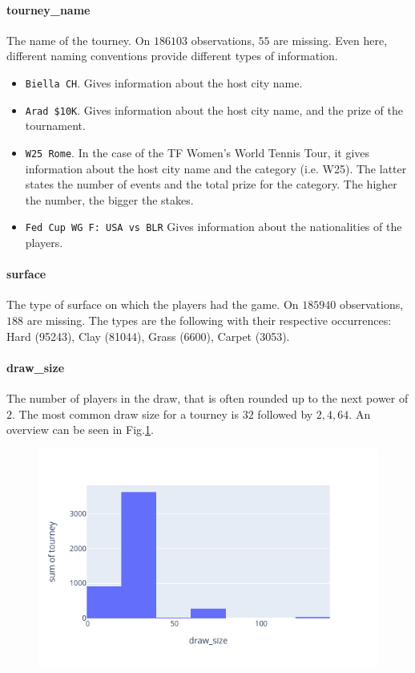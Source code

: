 \documentclass{article}
\begin{document}
\paragraph{tourney\_name}
The name of the tourney. On $186103$ observations, $55$ are missing. Even here, different naming conventions provide different types of information.
\begin{itemize}
    \item \verb|Biella CH|. Gives information about the host city name.
    \item \verb|Arad $10K|. Gives information about the host city name, and the prize of the tournament. 
    \item \verb|W25 Rome|. In the case of the TF Women's World Tennis Tour, it gives information about the host city name and the category (i.e. W25). The latter states the number of events and the total prize for the category. The higher the number, the bigger the stakes.
    \item \verb|Fed Cup WG F: USA vs BLR| Gives information about the nationalities of the players.
\end{itemize}

\paragraph{surface}
The type of surface on which the players had the game. On $185940$ observations, $188$ are missing. The types are the following with their respective occurrences: Hard (95243), Clay (81044), Grass (6600), Carpet (3053).

\paragraph{draw\_size}
The number of players in the draw, that is often rounded up to the next power of $2$. The most common draw size for a tourney is $32$ followed by $2,4,64$. An overview can be seen in Fig.\ref{fig:draw_size_tourney}.


\begin{figure}[h]
\centering
\includegraphics[width=.6\textwidth]{draw_size_tourney}
\label{fig:draw_size_tourney}
\end{figure}
\end{document}
